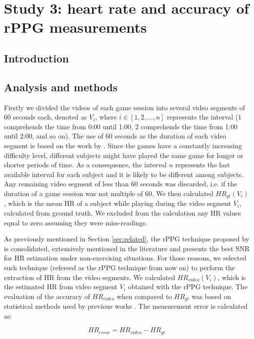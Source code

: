 \section{Study 3: heart rate and accuracy of rPPG measurements}

\subsection{Introduction}

\subsection{Analysis and methods}
Firstly we divided the videos of each game session into several video segments of 60 seconds each, denoted as $V_i$, where $i \in [1, 2, ..., n]$ represents the interval (1 comprehends the time from 0:00 until 1:00, 2 comprehends the time from 1:00 until 2:00, and so on). The use of 60 seconds as the duration of each video segment is based on the work by \textcite{poh2011advancements}. Since the games have a constantly increasing difficulty level, different subjects might have played the same game for longer or shorter periods of time. As a consequence, the interval $n$ represents the last available interval for each subject and it is likely to be different among subjects. Any remaining video segment of less than 60 seconds was discarded, i.e. if the duration of a game session was not multiple of 60. We then calculated $HR_{gt}(V_i)$, which is the mean HR of a subject while playing during the video segment $V_i$, calculated from ground truth. We excluded from the calculation any HR values equal to zero assuming they were miss-readings.

As previously mentioned in Section \ref{sec:related}, the rPPG technique proposed by \textcite{poh2011advancements} is consolidated, extensively mentioned in the literature and presents the best SNR for HR estimation under non-exercising situations. For those reasons, we selected such technique (refereed as the rPPG technique from now on) to perform the extraction of HR from the video segments. We calculated $HR_{video}(V_i)$, which is the estimated HR from video segment $V_i$ obtained with the rPPG technique. The evaluation of the accuracy of $HR_{video}$ when compared to $HR_{gt}$ was based on statistical methods used by previous works \parencite{poh2011advancements, rouast2016remote, li2014remote}. The measurement error is calculated as:

\begin{equation}
\label{eqn:hr-error}
HR_{error} = HR_{video} - HR_{gt}
\end{equation}

